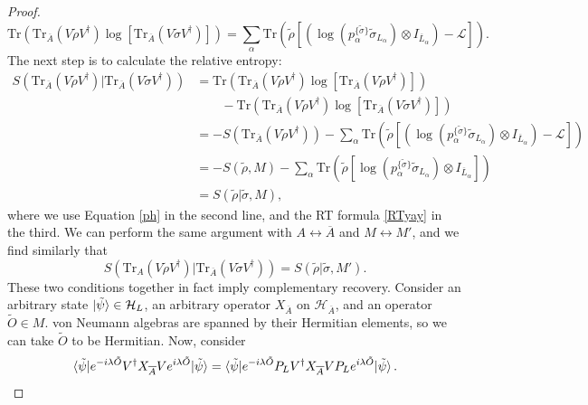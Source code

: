\documentclass[12pt,a4paper]{report}
\numberwithin{equation}{section}
\newcommand{\ol}[1]{\overline{#1}}
\newcommand{\tr}{\text{Tr}}
\theoremstyle{definition}
\theoremstyle{theorem}
\theoremstyle{theorem}
\theoremstyle{example}
\theoremstyle{definition}
\begin{document}
\begin{proof}
\begin{equation}
		\tr\left(\tr_{\ol{A}}\left(V\tilde{\rho} V^{\dagger}\right)\log\left[\tr_{\ol{A}}\left(V\tilde{\sigma} V^{\dagger}\right)\right]\right)=\sum_{\alpha}\tr\left(\tilde{\rho}\left[\left(\log\left(p_{\alpha}^{\{\tilde{\sigma}\}}\tilde{\sigma}_{L_{\alpha}}\right)\otimes I_{\ol{L}_{\alpha}}\right)-\mathcal{L}\right]\right).
	\end{equation}
	The next step is to calculate the relative entropy:
	\begin{equation}
		\begin{aligned}
			S\left(\tr_{\ol{A}}\left(V\tilde{\rho} V^{\dagger}\right)|\tr_{\ol{A}}\left(V\tilde{\sigma} V^{\dagger}\right)\right)&=\tr\left(\tr_{\ol{A}}\left(V\tilde{\rho} V^{\dagger}\right)\log\left[\tr_{\ol{A}}\left(V\tilde{\rho} V^{\dagger}\right)\right]\right)\\&\qquad-\tr\left(\tr_{\ol{A}}\left(V\tilde{\rho} V^{\dagger}\right)\log\left[\tr_{\ol{A}}\left(V\tilde{\sigma} V^{\dagger}\right)\right]\right)\\&=-S\left(\tr_{\ol{A}}\left(V\tilde{\rho} V^{\dagger}\right)\right)-\sum_{\alpha}\tr\left(\tilde{\rho}\left[\left(\log\left(p_{\alpha}^{\{\tilde{\sigma}\}}\tilde{\sigma}_{L_{\alpha}}\right)\otimes I_{\ol{L}_{\alpha}}\right)-\mathcal{L}\right]\right)\\&=-S(\tilde{\rho},M)-\sum_{\alpha}\tr\left(\tilde{\rho}\left[\log\left(p_{\alpha}^{\{\tilde{\sigma}\}}\tilde{\sigma}_{L_{\alpha}}\right)\otimes I_{\ol{L}_{\alpha}}\right]\right)\\&=S(\tilde{\rho}|\tilde{\sigma},M),
		\end{aligned}
	\end{equation}
	where we use Equation \ref{ph} in the second line, and the RT formula \ref{RTyay} in the third. We can perform the same argument with ${A}\leftrightarrow \ol{A}$ and $M\leftrightarrow M'$, and we find similarly that
	\begin{equation}\label{asd}
		S(\tr_{{A}}(V\tilde{\rho} V^{\dagger})|\tr_{\ol{A}}(V\tilde{\sigma} V^{\dagger}))=S(\tilde{\rho}|\tilde{\sigma},M').
	\end{equation}
	These two conditions together in fact imply complementary recovery. Consider an arbitrary state $\ket{\tilde{\psi}}\in\mathcal{H}_{L}$, an arbitrary operator $X_{\ol{A}}$ on $\mathcal{H}_{\ol{A}}$, and an operator $\tilde{O}\in M$. von Neumann algebras are spanned by their Hermitian elements, so we can take $\tilde{O}$ to be Hermitian. Now, consider
	\begin{equation}\label{asd1}
		\braket{\tilde{\psi}|e^{-i\lambda\tilde{O}}V^{\dagger}X_{\ol{A}}Ve^{i\lambda\tilde{O}}|\tilde{\psi}}=\braket{\tilde{\psi}|e^{-i\lambda\tilde{O}}P_{L}V^{\dagger}X_{\ol{A}}VP_{L}e^{i\lambda\tilde{O}}|\tilde{\psi}}.

\end{equation}
\end{proof}
\end{document}

